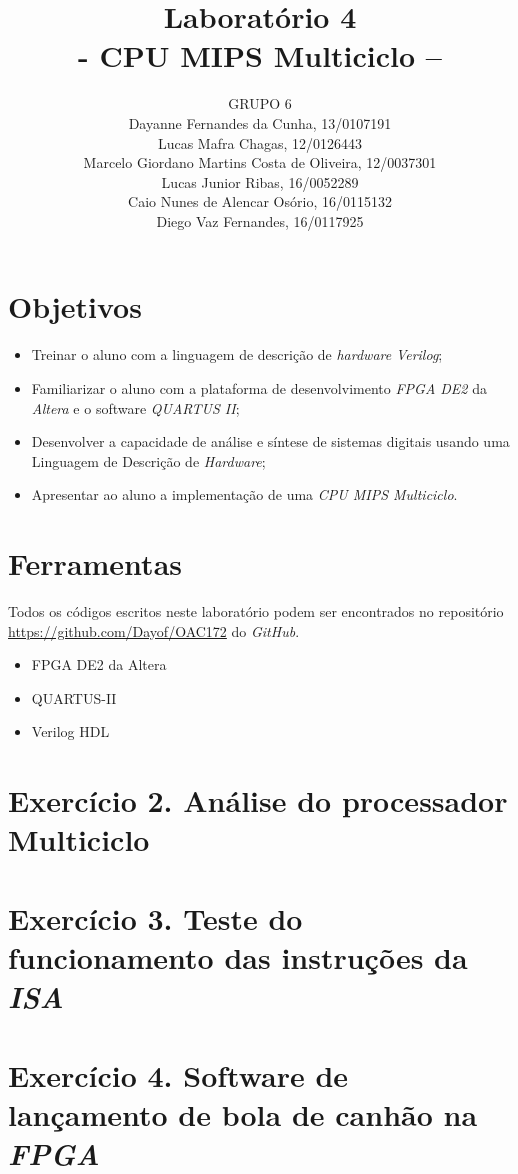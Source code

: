 \documentclass[12pt]{article}
\title{Laboratório 4\\- CPU MIPS Multiciclo –}
\author{GRUPO 6\\
	Dayanne Fernandes da Cunha, 13/0107191\\
	Lucas Mafra Chagas, 12/0126443\\
	Marcelo Giordano Martins Costa de Oliveira, 12/0037301\\
	Lucas Junior Ribas, 16/0052289\\
	Caio Nunes de Alencar Osório, 16/0115132\\
	Diego Vaz Fernandes, 16/0117925}
\begin{document}
\maketitle

\section{Objetivos}
\label{sec:Objetivos}

\begin{itemize}
\item Treinar o aluno com a linguagem de descrição de \textit{hardware} \textit{Verilog};
\item Familiarizar o aluno com a plataforma de desenvolvimento \textit{FPGA DE2} da \textit{Altera} e o software \textit{QUARTUS II};
\item Desenvolver a capacidade de análise e síntese de sistemas digitais usando uma Linguagem de Descrição de \textit{Hardware};
\item Apresentar ao aluno a implementação de uma \textit{CPU MIPS Multiciclo}.
\end{itemize}

\section{Ferramentas}
\label{sec:Materiais}

Todos os códigos escritos neste laboratório podem ser encontrados no repositório \url{https://github.com/Dayof/OAC172} do \textit{GitHub}.

\begin{itemize}
\item FPGA DE2 da Altera 
\item QUARTUS-II
\item Verilog HDL
\end{itemize}

\section{Exercício 2. Análise do processador Multiciclo}
\label{sec:multiciclo}


\section{Exercício 3. Teste do funcionamento das instruções da \textit{ISA} }
\label{sec:testeisa}


\section{Exercício 4. Software de lançamento de bola de canhão na \textit{FPGA}}
\label{sec:canhao}
\end{document}
